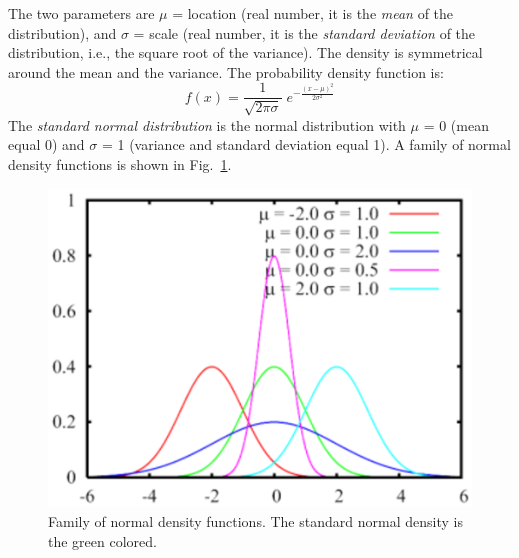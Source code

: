 The two parameters are $\mu$ = location (real number, it is the
\emph{mean} of the distribution), and $\sigma$ = scale (real
number, it is the \emph{standard deviation} of the distribution,
i.e., the square root of the variance). The density is symmetrical
around the mean and the variance. The probability density function
is:
\[
f(x) = \frac{1}{\sqrt{2 \pi \sigma}} \; e^{-\frac{(x-\mu)^2}{2
\sigma^2}}
\]
 The \emph{standard normal distribution} is the normal
distribution with $\mu$ = 0 (mean equal 0) and $\sigma$ = 1
(variance and standard deviation equal 1). A family of normal
density functions is shown in Fig.~\ref{fig:famNorm}.
\begin{figure}[htb]
    \begin{center}
        \includegraphics[scale=.5]{img/jsimg/4.9.eps}
    \end{center}
    \caption{Family of normal density functions. The
standard normal density is the green colored.}
    \label{fig:famNorm}
\end{figure}\\

